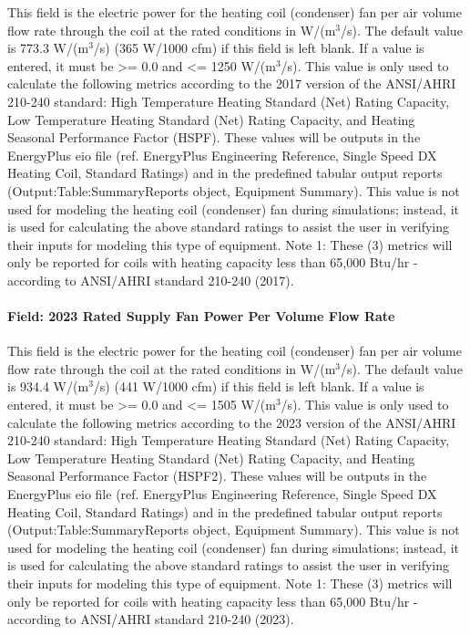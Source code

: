This field is the electric power for the heating coil (condenser) fan per air volume flow rate through the coil at the rated conditions in W/(m\(^{3}\)/s). The default value is 773.3 W/(m\(^{3}\)/s) (365 W/1000 cfm) if this field is left blank. If a value is entered, it must be \textgreater{}= 0.0 and \textless{}= 1250 W/(m\(^{3}\)/s). This value is only used to calculate the following metrics according to the 2017 version of the ANSI/AHRI 210-240 standard: High Temperature Heating Standard (Net) Rating Capacity, Low Temperature Heating Standard (Net) Rating Capacity, and Heating Seasonal Performance Factor (HSPF). These values will be outputs in the EnergyPlus eio file (ref. EnergyPlus Engineering Reference, Single Speed DX Heating Coil, Standard Ratings) and in the predefined tabular output reports (Output:Table:SummaryReports object, Equipment Summary). This value is not used for modeling the heating coil (condenser) fan during simulations; instead, it is used for calculating the above standard ratings to assist the user in verifying their inputs for modeling this type of equipment.
Note 1: These (3) metrics will only be reported for coils with heating capacity less than 65,000 Btu/hr - according to ANSI/AHRI standard 210-240 (2017).

\paragraph{Field: 2023 Rated Supply Fan Power Per Volume Flow Rate}\label{field-2023-rated-supply-fan-power-per-volume-flow-rate-1}

This field is the electric power for the heating coil (condenser) fan per air volume flow rate through the coil at the rated conditions in W/(m\(^{3}\)/s). The default value is 934.4 W/(m\(^{3}\)/s) (441 W/1000 cfm) if this field is left blank. If a value is entered, it must be \textgreater{}= 0.0 and \textless{}= 1505 W/(m\(^{3}\)/s). This value is only used to calculate the following metrics according to the 2023 version of the ANSI/AHRI 210-240 standard: High Temperature Heating Standard (Net) Rating Capacity, Low Temperature Heating Standard (Net) Rating Capacity, and Heating Seasonal Performance Factor (HSPF2). These values will be outputs in the EnergyPlus eio file (ref. EnergyPlus Engineering Reference, Single Speed DX Heating Coil, Standard Ratings) and in the predefined tabular output reports (Output:Table:SummaryReports object, Equipment Summary). This value is not used for modeling the heating coil (condenser) fan during simulations; instead, it is used for calculating the above standard ratings to assist the user in verifying their inputs for modeling this type of equipment.
Note 1: These (3) metrics will only be reported for coils with heating capacity less than 65,000 Btu/hr - according to ANSI/AHRI standard 210-240 (2023).

